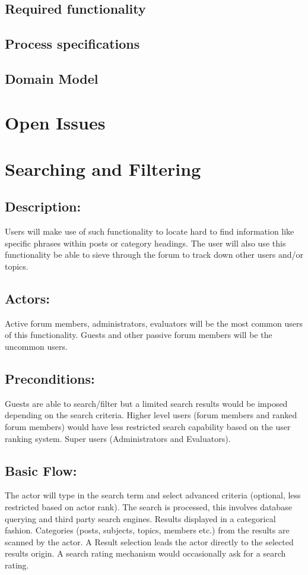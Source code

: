 \documentclass[12pt, oneside]{book}
\begin{document}
\subsection{Required functionality}
\subsection{Process specifications}
\subsection{Domain Model}
\section{Open Issues}


\section{Searching and Filtering}
\subsection{Description:}
Users will make use of such functionality to locate hard to find information like specific phrases within posts or category headings. The user will also use this functionality be able to sieve through the forum to track down other users and/or topics.  
\subsection{Actors:} 
Active forum members, administrators, evaluators will be the most common users of this functionality. Guests and other passive forum members will be the uncommon users.
\subsection{Preconditions:} 
Guests are able to search/filter but a limited search results would be imposed depending on the search criteria. Higher level users (forum members and ranked forum members) would have less restricted search capability based on the user ranking system. Super users (Administrators and Evaluators). \subsection{Basic Flow:} 
The actor will type in the search term and select advanced criteria (optional, less restricted based on actor rank). The search is processed, this involves database querying and third party search engines. Results displayed in a categorical fashion. Categories (posts, subjects, topics, members etc.) from the results are scanned by the actor. A Result selection leads the actor directly to the selected results origin. A search rating mechanism would occasionally ask for a search rating.  
\end{document}
